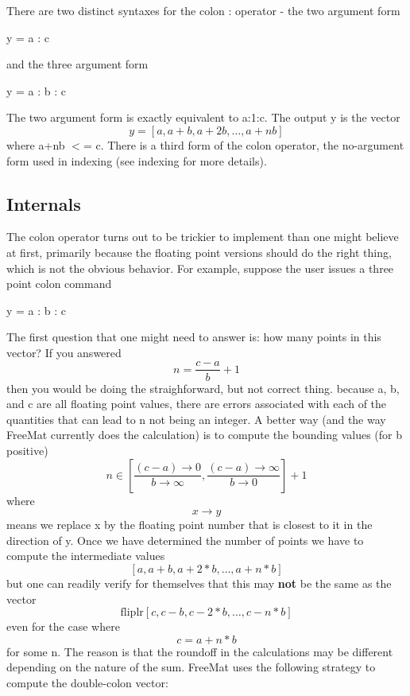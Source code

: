 There are two distinct syntaxes for the colon {\ttfamily \-:} operator -\/ the two argument form \begin{DoxyVerb}  y = a : c
\end{DoxyVerb}
 and the three argument form \begin{DoxyVerb}  y = a : b : c
\end{DoxyVerb}
 The two argument form is exactly equivalent to {\ttfamily a\-:1\-:c}. The output {\ttfamily y} is the vector \[ y = [a,a+b,a+2b,\ldots,a+nb] \] where {\ttfamily a+nb $<$= c}. There is a third form of the colon operator, the no-\/argument form used in indexing (see {\ttfamily indexing} for more details). \hypertarget{transforms_svd_Function}{}\subsection{Internals}\label{transforms_svd_Function}
The colon operator turns out to be trickier to implement than one might believe at first, primarily because the floating point versions should do the right thing, which is not the obvious behavior. For example, suppose the user issues a three point colon command \begin{DoxyVerb}   y = a : b : c
\end{DoxyVerb}
 The first question that one might need to answer is\-: how many points in this vector? If you answered \[ n = \frac{c-a}{b}+1 \] then you would be doing the straighforward, but not correct thing. because a, b, and c are all floating point values, there are errors associated with each of the quantities that can lead to n not being an integer. A better way (and the way Free\-Mat currently does the calculation) is to compute the bounding values (for b positive) \[ n \in \left[\frac{(c-a) \rightarrow 0}{b \rightarrow \infty}, \frac{(c-a) \rightarrow \infty}{b \rightarrow 0} \right] + 1 \] where \[ x \rightarrow y \] means we replace x by the floating point number that is closest to it in the direction of y. Once we have determined the number of points we have to compute the intermediate values \[ [a, a+b, a+2*b, \ldots, a+n*b] \] but one can readily verify for themselves that this may {\bfseries not} be the same as the vector \[ \mathrm{fliplr} [c, c-b, c-2*b, \ldots, c-n*b] \] even for the case where \[ c = a + n*b \] for some n. The reason is that the roundoff in the calculations may be different depending on the nature of the sum. Free\-Mat uses the following strategy to compute the double-\/colon vector\-: 
